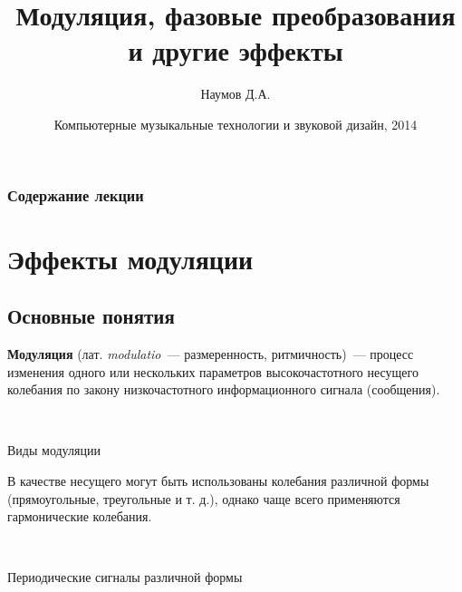 \documentclass{beamer}
\title{Модуляция, фазовые преобразования и другие эффекты}
\author{Наумов Д.А.}
\date[16.04.2014] {Компьютерные музыкальные технологии и звуковой дизайн, 2014}
\begin{document}
\begin{frame}
  \titlepage
\end{frame}

\begin{frame}
  \frametitle{Содержание лекции}
  \tableofcontents
\end{frame}

\section{Эффекты модуляции}
\subsection{Основные понятия}
\begin{frame}
  \textbf{Модуляция} (лат. \textit{modulatio}~--- размеренность, ритмичность)~--- процесс изменения одного или нескольких параметров высокочастотного несущего колебания по закону низкочастотного информационного сигнала (сообщения).

  ~

  \begin{block}{Виды модуляции}
  \end{block}
\end{frame}

\begin{frame}
  В качестве несущего могут быть использованы колебания различной формы (прямоугольные, треугольные и т. д.), однако чаще всего применяются гармонические колебания.

  ~

  \begin{block}{Периодические сигналы различной формы}
  \end{block}
\end{frame}
\end{document}
